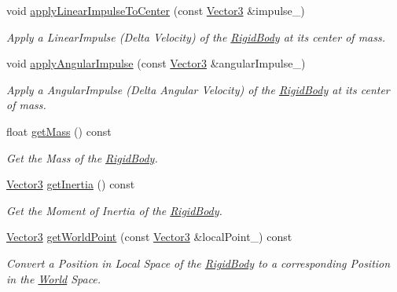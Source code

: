\begin{DoxyCompactItemize}
void \hyperlink{class_magnum_1_1_physics3_1_1_rigid_body_afe20000f997c567883501683fd52e3d2}{apply\+Linear\+Impulse\+To\+Center} (const \hyperlink{class_magnum_1_1_vector3}{Vector3} \&impulse\+\_\+)
\begin{DoxyCompactList}\small\item\em Apply a Linear\+Impulse (Delta Velocity) of the \hyperlink{class_magnum_1_1_physics3_1_1_rigid_body}{Rigid\+Body} at its center of mass. \end{DoxyCompactList}\item 
void \hyperlink{class_magnum_1_1_physics3_1_1_rigid_body_ad85c102de6c0fb6bd409ad6ac936d036}{apply\+Angular\+Impulse} (const \hyperlink{class_magnum_1_1_vector3}{Vector3} \&angular\+Impulse\+\_\+)
\begin{DoxyCompactList}\small\item\em Apply a Angular\+Impulse (Delta Angular Velocity) of the \hyperlink{class_magnum_1_1_physics3_1_1_rigid_body}{Rigid\+Body} at its center of mass. \end{DoxyCompactList}\item 
float \hyperlink{class_magnum_1_1_physics3_1_1_rigid_body_ae0852121bbefb153c39da26de02fbef9}{get\+Mass} () const 
\begin{DoxyCompactList}\small\item\em Get the Mass of the \hyperlink{class_magnum_1_1_physics3_1_1_rigid_body}{Rigid\+Body}. \end{DoxyCompactList}\item 
\hyperlink{class_magnum_1_1_vector3}{Vector3} \hyperlink{class_magnum_1_1_physics3_1_1_rigid_body_a842e3172bdbbea66d79b756d7b46192c}{get\+Inertia} () const 
\begin{DoxyCompactList}\small\item\em Get the Moment of Inertia of the \hyperlink{class_magnum_1_1_physics3_1_1_rigid_body}{Rigid\+Body}. \end{DoxyCompactList}\item 
\hyperlink{class_magnum_1_1_vector3}{Vector3} \hyperlink{class_magnum_1_1_physics3_1_1_rigid_body_a30b1d075890c5178d8a9a7c7e44ab030}{get\+World\+Point} (const \hyperlink{class_magnum_1_1_vector3}{Vector3} \&local\+Point\+\_\+) const 
\begin{DoxyCompactList}\small\item\em Convert a Position in Local Space of the \hyperlink{class_magnum_1_1_physics3_1_1_rigid_body}{Rigid\+Body} to a corresponding Position in the \hyperlink{class_magnum_1_1_physics3_1_1_world}{World} Space. \end{DoxyCompactList}\item 

\end{DoxyCompactItemize}
